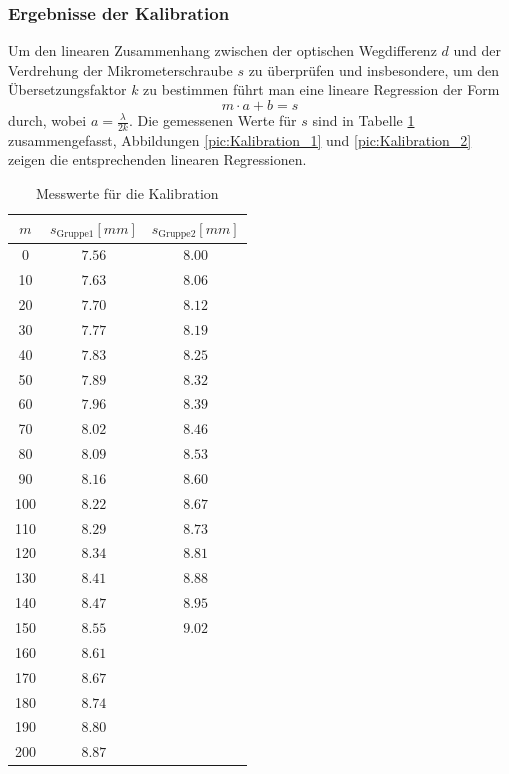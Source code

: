 \documentclass[a4paper, 11pt]{article}
\begin{document}
\subsubsection{Ergebnisse der Kalibration}
Um den linearen Zusammenhang zwischen der optischen Wegdifferenz $d$ und der Verdrehung der Mikrometerschraube $s$ zu überprüfen und insbesondere, um den Übersetzungsfaktor $k$ zu bestimmen führt man eine lineare Regression der Form 
\begin{equation*}
m \cdot a + b = s
\end{equation*} 
durch, wobei $ a = \frac{\lambda}{2 k} $.
Die gemessenen Werte für $s$ sind in Tabelle \ref{table:Kalibration_Roh} zusammengefasst, Abbildungen \ref{pic:Kalibration_1} und \ref{pic:Kalibration_2} zeigen die entsprechenden linearen Regressionen.

\begin{table}[H]
	\renewcommand{\arraystretch}{1.2}
	\centering
	\begin{tabular}{|c|c|c|}
		\hline  $m$	&	$s_{\mathrm{Gruppe 1}} [mm]$	&	$s_{\mathrm{Gruppe 2}} [mm]$	\\
		\hline	  0	&	$ 7.56 $		&	$ 8.00$ \\
		\hline   10	&	$ 7.63 $		&	$ 8.06$ \\
		\hline   20	&	$ 7.70 $		&	$ 8.12$ \\
		\hline   30	&	$ 7.77 $		&	$ 8.19$ \\
		\hline   40	&	$ 7.83 $		&	$ 8.25$ \\
		\hline   50	&	$ 7.89 $		&	$ 8.32$ \\
		\hline   60	&	$ 7.96 $		&	$ 8.39$ \\
		\hline   70	&	$ 8.02 $		&	$ 8.46$ \\
		\hline   80	&	$ 8.09 $		&	$ 8.53$ \\
		\hline   90 &	$ 8.16 $		&	$ 8.60$ \\
		\hline  100	&	$ 8.22 $		&	$ 8.67$ \\
		\hline  110	&	$ 8.29 $		&	$ 8.73$ \\
		\hline  120	&	$ 8.34 $		&	$ 8.81$ \\
		\hline  130	&	$ 8.41 $		&	$ 8.88$ \\
		\hline  140	&	$ 8.47 $		&	$ 8.95$ \\
		\hline  150	&	$ 8.55 $		&	$ 9.02$ \\
		\hline  160	&	$ 8.61 $		&	$ $ \\
		\hline  170	&	$ 8.67 $		&	$ $ \\
		\hline  180	&	$ 8.74 $		&	$ $ \\
		\hline  190	&	$ 8.80 $		&	$ $ \\
		\hline  200	&	$ 8.87 $		&	$ $ \\
		\hline
	\end{tabular}
	\caption{Messwerte für die Kalibration}
	\label{table:Kalibration_Roh}
\end{table}
\end{document}
